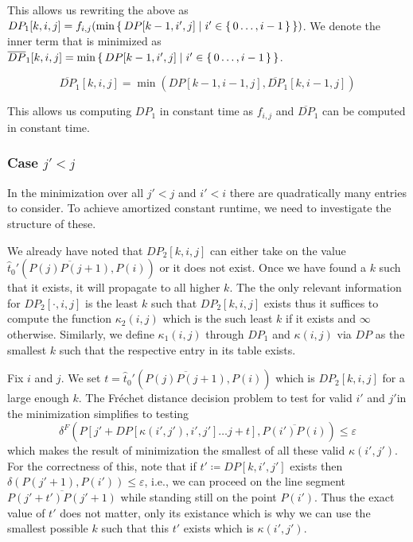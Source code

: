 This allows us rewriting the above as \(DP_1[k, i, j] = f_{i, j}(\min \set{DP[k-1, i', j] \mid i' \in \set{0 \dots, i - 1} })\). We denote the inner term that is minimized as \(\overline{DP}_1[k,i,j] = \min \set{DP[k-1, i', j] \mid i' \in \set{0 \dots, i - 1}}\). 

\begin{observation}
	\[\overline{DP}_1[k,i,j] = \min (DP[k-1, i - 1, j], \overline{DP}_1[k, i - 1, j])\]
\end{observation}

This allows us computing \(DP_1\) in constant time as \(f_{i, j}\) and \(\overline{DP}_1\) can be computed in constant time.


\subsubsection{Case \(j' < j\)}

In the minimization over all \(j' < j\) and \(i' < i\) there are quadratically many entries to consider. To achieve amortized constant runtime, we need to investigate the structure of these. 

We already have noted that \(DP_2[k,i,j]\) can either take on the value \(\hat t_0'(\overline{P(j)P(j+1)}, P(i))\) or it does not exist. Once we have found a \(k\) such that it exists, it will propagate to all higher \(k\). The the only relevant information for \(DP_2[\cdot, i, j]\) is the least \(k\) such that \(DP_2[k,i,j]\) exists thus it suffices to compute the function \(\kappa_2(i,j)\) which is the such least \(k\) if it exists and \(\infty\) otherwise. Similarly, we define \(\kappa_1(i,j)\) through \(DP_1\) and \(\kappa(i,j)\) via \(DP\) as the smallest \(k\) such that the respective entry in its table exists. 

Fix \(i\) and \(j\). We set \(t = \hat t_0'(\overline{P(j)P(j+1)}, P(i))\) which is \(DP_2[k, i, j]\) for a large enough \(k\). The Fréchet distance decision problem to test for valid \(i'\) and \(j'\)in the minimization simplifies to testing 
\begin{equation}\label{eq:dp2-ag}
	\delta^F(P[j' + DP[\kappa(i', j'),i', j'] \dots j + t], \overline{P(i')P(i)}) \leq \varepsilon
\end{equation}
which makes the result of minimization the smallest of all these valid \(\kappa(i', j')\). For the correctness of this, note that if \(t' \coloneq DP[k, i', j']\) exists then \(\delta(P(j' + 1), P(i') ) \leq \varepsilon\), i.e., we can proceed on the line segment \(\overline{P(j' + t')P(j' + 1)}\) while standing still on the point \(P(i')\). Thus the exact value of \(t'\) does not matter, only its existance which is why we can use the smallest possible \(k\) such that this \(t'\) exists which is \(\kappa(i',j')\). 

